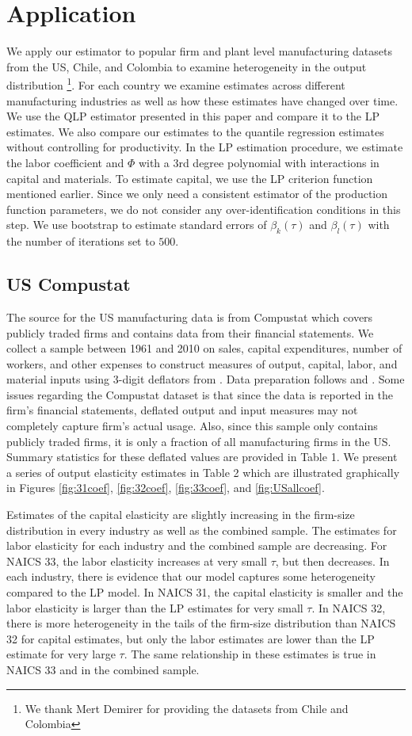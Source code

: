 \documentclass[11pt]{article}
\begin{document}
\section{Application} \label{application}
We apply our estimator to popular firm and plant level manufacturing datasets from the US, Chile, and Colombia to examine heterogeneity in the output distribution \footnote{We thank Mert Demirer for providing the datasets from Chile and Colombia}. For each country we examine estimates across different manufacturing industries as well as how these estimates have changed over time. We use the QLP estimator presented in this paper and compare it to the LP estimates. We also compare our estimates to the quantile regression estimates without controlling for productivity. In the LP estimation procedure, we estimate the labor coefficient and $\Phi$ with a 3rd degree polynomial with interactions in capital and materials. To estimate capital, we use the LP criterion function mentioned earlier. Since we only need a consistent estimator of the production function parameters, we do not consider any over-identification conditions in this step. We use bootstrap to estimate standard errors of $\beta_{k}(\tau)$ and $\beta_{l}(\tau)$ with the number of iterations set to $500$.
\subsection{US Compustat}
The source for the US manufacturing data is from Compustat which covers publicly traded firms and contains data from their financial statements. We collect a sample between 1961 and 2010 on sales, capital expenditures, number of workers, and other expenses to construct measures of output, capital, labor, and material inputs using 3-digit deflators from \cite{nber}. Data preparation follows \cite{Keller2009} and \cite{mert}. Some issues regarding the Compustat dataset is that since the data is reported in the firm's financial statements, deflated output and input measures may not completely capture firm's actual usage. Also, since this sample only contains publicly traded firms, it is only a fraction of all manufacturing firms in the US. Summary statistics for these deflated values are provided in Table 1. We present a series of output elasticity estimates in Table 2 which are illustrated graphically in Figures \ref{fig:31coef}, \ref{fig:32coef}, \ref{fig:33coef}, and \ref{fig:USallcoef}.

Estimates of the capital elasticity are slightly increasing in the firm-size distribution in every industry as well as the combined sample. The estimates for labor elasticity for each industry and the combined sample are decreasing. For NAICS 33, the labor elasticity increases at very small $\tau$, but then decreases. In each industry, there is evidence that our model captures some heterogeneity compared to the LP model. In NAICS 31, the capital elasticity is smaller and the labor elasticity is larger than the LP estimates for very small $\tau$. In NAICS 32, there is more heterogeneity in the tails of the firm-size distribution than NAICS 32 for capital estimates, but only the labor estimates are lower than the LP estimate for very large $\tau$. The same relationship in these estimates is true in NAICS 33 and in the combined sample.
 
\end{document}
